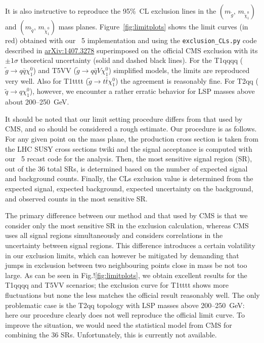 It is also instructive to reproduce the 95\%~CL exclusion lines in the $(m_{\tilde g},\,m_{\tilde\chi^0_1})$ 
and $(m_{\tilde q},\,m_{\tilde\chi^0_1})$ mass planes.  
Figure~\ref{fig:limitplots}  shows the limit curves (in red) obtained with our 
{}~5 implementation and using the {\tt{exclusion\_CLs.py}} code described in 
\href{http://arxiv.org/abs/arXiv:1407.3278}{arXiv:1407.3278} 
superimposed on the official CMS exclusion with its $\pm 1\sigma$ theoretical uncertainty (solid and dashed black lines).  For the T1qqqq ($\tilde{g}\to q\bar{q}\chi_{1}^{0}$) and T5VV ($\tilde{g} \to q\bar{q}V\chi_{1}^{0}$) simplified models, the limits are reproduced very well. 
Also for T1tttt ($\tilde{g}\to t\bar{t}\chi_{1}^{0}$) the agreement is reasonably fine. 
For T2qq ($\tilde{q}\to q \chi_{1}^{0} $), however, we encounter a rather erratic behavior for 
LSP masses above about 200--250~GeV.

It should be noted that our limit setting procedure differs from that used by CMS, and so should be 
considered a rough estimate. Our procedure is as follows. For any given point
on the mass plane, the production cross section is taken from the LHC SUSY cross sections twiki 
and the signal acceptance is computed with our {}~5 recast code for the analysis.
Then, the most sensitive signal region (SR), out of the 36 total SRs, is determined based on the 
number of expected signal and background counts. 
Finally, the CLs exclusion value is determined from the expected signal, expected
background, expected uncertainty on the background, and observed counts in the most sensitive
SR. 

The primary difference between our method and that used by CMS is that we consider only the most sensitive SR
in the exclusion calculation, whereas CMS uses all signal regions simultaneously and considers correlations
in the uncertainty between signal regions. This difference introduces a certain volatility in our  
exclusion limits, which can however be mitigated by demanding that jumps in exclsusion between two 
neighbouring points close in mass be not too large. 
As can be seen in Fig.!\ref{fig:limitplots}, we obtain excellent results for the T1qqqq and T5VV scenarios; the 
exclusion curve for T1tttt shows more fluctuations but none the less matches the official result reasonably well. 
The only problematic case is the T2qq topology with LSP masses above 200--250~GeV: here our procedure 
clearly does not well reproduce the official limit curve. To improve the situation, we would need the  
statistical model from CMS for combining  the 36 SRs. Unfortunately, this is currently not available.   

